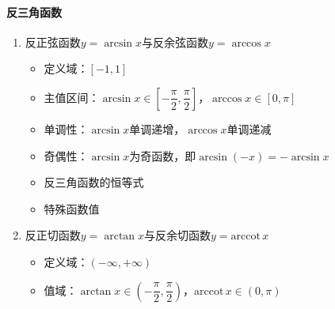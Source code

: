 \documentclass[../book.tex]{subfiles}
\begin{document}
    \paragraph{反三角函数}
    \begin{enumerate}
        \item 反正弦函数$y = \arcsin x$与反余弦函数$y = \arccos x$
        \begin{itemize}
            \item 定义域：$[-1, 1]$
            \item 主值区间：$\arcsin x \in \left[-\dfrac{\pi}{2}, \dfrac{\pi}{2}\right]$，$\arccos x \in [0, \pi]$
            \item 单调性：$\arcsin x$单调递增，$\arccos x$单调递减
            \item 奇偶性：$\arcsin x$为奇函数，即$\arcsin(-x) = -\arcsin x$
            \item 反三角函数的恒等式
            \item 特殊函数值
        \end{itemize}
        \item 反正切函数$y = \arctan x$与反余切函数$y = \mathrm{arccot}\, x$
        \begin{itemize}
            \item 定义域：$(-\infty, +\infty)$
            \item 值域：$\arctan x \in \left(-\dfrac{\pi}{2}, \dfrac{\pi}{2}\right)$，$\mathrm{arccot}\, x \in (0, \pi)$

\end{itemize}
\end{enumerate}
\end{document}
